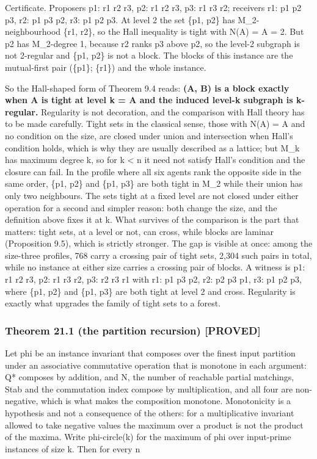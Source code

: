 \documentclass[
  11pt,
]{article}
\begin{document}
Certificate. Proposers p1: r1 r2 r3, p2: r1 r2 r3, p3: r1 r3 r2;
receivers r1: p1 p2 p3, r2: p1 p3 p2, r3: p1 p2 p3. At level 2 the set
\{p1, p2\} has M\_2-neighbourhood \{r1, r2\}, so the Hall inequality is
tight with \textbar N(A)\textbar{} = \textbar A\textbar{} = 2. But p2
has M\_2-degree 1, because r2 ranks p3 above p2, so the level-2 subgraph
is not 2-regular and \{p1, p2\} is not a block. The blocks of this
instance are the mutual-first pair (\{p1\}; \{r1\}) and the whole
instance.

So the Hall-shaped form of Theorem 9.4 reads: \textbf{(A, B) is a block
exactly when A is tight at level k = \textbar A\textbar{} and the
induced level-k subgraph is k-regular.} Regularity is not decoration,
and the comparison with Hall theory has to be made carefully. Tight sets
in the classical sense, those with \textbar N(A)\textbar{} =
\textbar A\textbar{} and no condition on the size, are closed under
union and intersection when Hall's condition holds, which is why they
are usually described as a lattice; but M\_k has maximum degree k, so
for k \textless{} n it need not satisfy Hall's condition and the closure
can fail. In the profile where all six agents rank the opposite side in
the same order, \{p1, p2\} and \{p1, p3\} are both tight in M\_2 while
their union has only two neighbours. The sets tight at a fixed level are
not closed under either operation for a second and simpler reason: both
change the size, and the definition above fixes it at k. What survives
of the comparison is the part that matters: tight sets, at a level or
not, can cross, while blocks are laminar (Proposition 9.5), which is
strictly stronger. The gap is visible at once: among the size-three
profiles, 768 carry a crossing pair of tight sets, 2,304 such pairs in
total, while no instance at either size carries a crossing pair of
blocks. A witness is p1: r1 r2 r3, p2: r1 r3 r2, p3: r2 r3 r1 with r1:
p1 p3 p2, r2: p2 p3 p1, r3: p1 p2 p3, where \{p1, p2\} and \{p1, p3\}
are both tight at level 2 and cross. Regularity is exactly what upgrades
the family of tight sets to a forest.

\hypertarget{theorem-21.1-the-partition-recursion-proved}{%
\subsubsection{Theorem 21.1 (the partition recursion)
{[}PROVED{]}}\label{theorem-21.1-the-partition-recursion-proved}}

Let phi be an instance invariant that composes over the finest input
partition under an associative commutative operation that is monotone in
each argument: Q* composes by addition, and N, the number of reachable
partial matchings, \textbar Stab\textbar{} and the commutation index
compose by multiplication, and all four are non-negative, which is what
makes the composition monotone. Monotonicity is a hypothesis and not a
consequence of the others: for a multiplicative invariant allowed to
take negative values the maximum over a product is not the product of
the maxima. Write phi-circle(k) for the maximum of phi over input-prime
instances of size k. Then for every n
\end{document}

